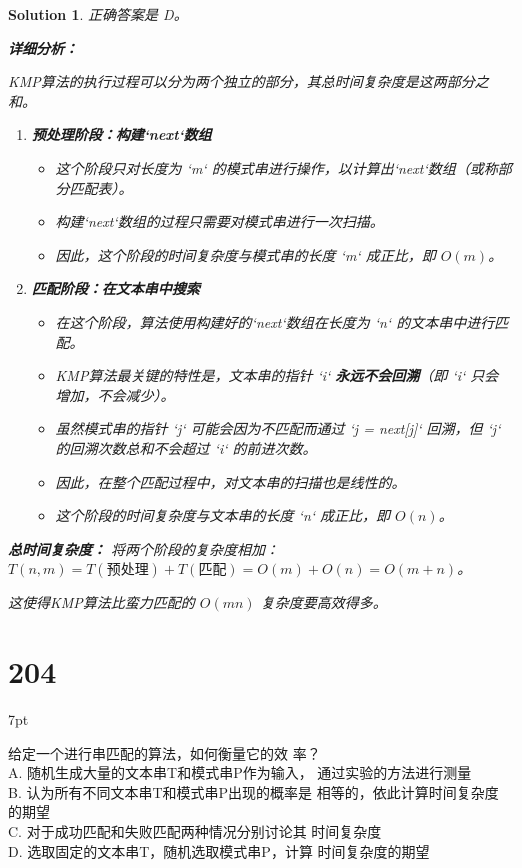 \documentclass[UTF8]{report}
\newtheorem{solution}{Solution}
\theoremstyle{MyLineTheoremStyle} %
\theoremstyle{MyBlockTheoremStyle} %
\theoremstyle{MySubsubsectionStyle} %
\newenvironment{graybox}{%
        \def\FrameCommand{%
        \hspace{1pt}%
        {\color{gray}\small \vrule width 2pt}%
        {\color{graybox_color}\vrule width 4pt}%
        \colorbox{graybox_color}%
        }%
        \MakeFramed{\advance\hsize-\width\FrameRestore}%
        \noindent\hspace{-4.55pt}%
        \begin{adjustwidth}{}{7pt}%
        \vspace{2pt}\vspace{2pt}%
        }
        {%
        \vspace{2pt}\end{adjustwidth}\endMakeFramed%
        }
\begin{document}
\begin{solution}
正确答案是 D。

\textbf{详细分析：}

KMP算法的执行过程可以分为两个独立的部分，其总时间复杂度是这两部分之和。

\begin{enumerate}
    \item \textbf{预处理阶段：构建`next`数组}
    \begin{itemize}
        \item 这个阶段只对长度为 `m` 的模式串进行操作，以计算出`next`数组（或称部分匹配表）。
        \item 构建`next`数组的过程只需要对模式串进行一次扫描。
        \item 因此，这个阶段的时间复杂度与模式串的长度 `m` 成正比，即 $O(m)$。
    \end{itemize}

    \item \textbf{匹配阶段：在文本串中搜索}
    \begin{itemize}
        \item 在这个阶段，算法使用构建好的`next`数组在长度为 `n` 的文本串中进行匹配。
        \item KMP算法最关键的特性是，文本串的指针 `i` \textbf{永远不会回溯}（即 `i` 只会增加，不会减少）。
        \item 虽然模式串的指针 `j` 可能会因为不匹配而通过 `j = next[j]` 回溯，但 `j` 的回溯次数总和不会超过 `i` 的前进次数。
        \item 因此，在整个匹配过程中，对文本串的扫描也是线性的。
        \item 这个阶段的时间复杂度与文本串的长度 `n` 成正比，即 $O(n)$。
    \end{itemize}
\end{enumerate}

\textbf{总时间复杂度：}
将两个阶段的复杂度相加：
$T(n, m) = T(\text{预处理}) + T(\text{匹配}) = O(m) + O(n) = O(m+n)$。

这使得KMP算法比蛮力匹配的 $O(mn)$ 复杂度要高效得多。
\end{solution}

\section*{204}
\begin{graybox}
给定一个进行串匹配的算法，如何衡量它的效
率？\\
A. 随机生成大量的文本串T和模式串P作为输入，
通过实验的方法进行测量\\
B. 认为所有不同文本串T和模式串P出现的概率是
相等的，依此计算时间复杂度的期望\\
C. 对于成功匹配和失败匹配两种情况分别讨论其
时间复杂度\\
D. 选取固定的文本串T，随机选取模式串P，计算
时间复杂度的期望
\end{graybox}
\end{document}
